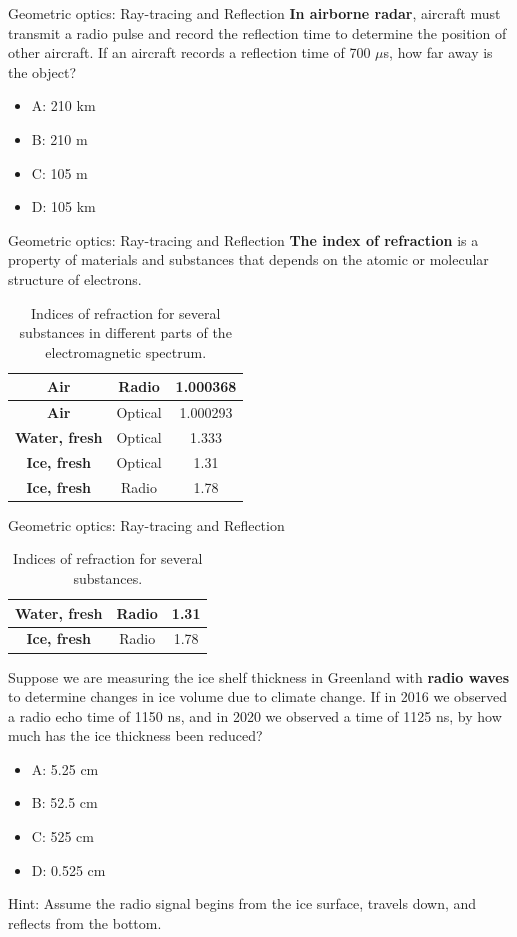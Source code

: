 \documentclass{beamer}
\begin{document}
\begin{frame}{Geometric optics: Ray-tracing and Reflection}
\textbf{In airborne radar}, aircraft must transmit a radio pulse and record the reflection time to determine the position of other aircraft.  If an aircraft records a reflection time of 700 $\mu$s, how far away is the object?
\begin{itemize}
\item A: 210 km
\item B: 210 m
\item C: 105 m
\item D: 105 km
\end{itemize}
\end{frame}

\begin{frame}{Geometric optics: Ray-tracing and Reflection}
\textbf{\alert{The index of refraction}} is a property of materials and substances that depends on the atomic or molecular structure of electrons.
\begin{table}
\centering
\begin{tabular}{| c | c | c |}
\hline
\textbf{Air} & Radio & 1.000368 \\ \hline
\textbf{Air} & Optical & 1.000293 \\ \hline
\textbf{Water, fresh} & Optical & 1.333 \\ \hline
\textbf{Ice, fresh} & Optical & 1.31 \\ \hline
\textbf{Ice, fresh} & Radio & 1.78 \\ \hline
\end{tabular}
\caption{\label{tab:n} Indices of refraction for several substances in different parts of the electromagnetic spectrum.}
\end{table}
\end{frame}

\begin{frame}{Geometric optics: Ray-tracing and Reflection}
\begin{table}
\footnotesize
\centering
\begin{tabular}{| c | c | c |}
\hline
\textbf{Water, fresh} & Radio & 1.31 \\ \hline
\textbf{Ice, fresh} & Radio & 1.78 \\ \hline
\end{tabular}
\caption{\label{tab:n2} \footnotesize Indices of refraction for several substances.}
\end{table}
\footnotesize
Suppose we are measuring the ice shelf thickness in Greenland with \textbf{radio waves} to determine changes in ice volume due to climate change.  If in 2016 we observed a radio echo time of 1150 ns, and in 2020 we observed a time of 1125 ns, by how much has the ice thickness been reduced?
\begin{itemize}
\item A: 5.25 cm
\item B: 52.5 cm
\item C: 525 cm
\item D: 0.525 cm
\end{itemize}
\footnotesize
Hint: Assume the radio signal begins from the ice surface, travels down, and reflects from the bottom.
\end{frame}
\end{document}
